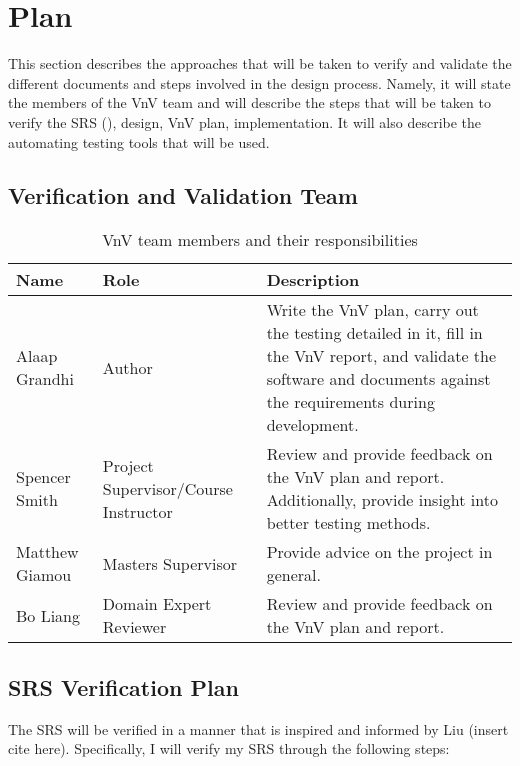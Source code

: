 \documentclass[12pt, titlepage]{article}
\begin{document}
\section{Plan}

This section describes the approaches that will be taken to verify and validate the different documents
and steps involved in the design process. Namely, it will state the members of the VnV team and will describe
the steps that will be taken to verify the SRS (\cite{SRS}), design, VnV plan, implementation. It will also describe the automating
testing tools that will be used.

\subsection{Verification and Validation Team}

\begin{table}[H]
  \centering
  \begin{tabular}{|p{3cm}|p{3cm}|p{6cm}|}
  \hline
  \textbf{Name} & \textbf{Role} & \textbf{Description} \\ \hline
  Alaap Grandhi & Author & Write the VnV plan, carry out the testing detailed in it, fill in the VnV report, and validate the software and documents against the requirements during development. \\ \hline
  Spencer Smith & Project Supervisor/Course Instructor & Review and provide feedback on the VnV plan and report. Additionally, provide insight into better testing methods. \\ \hline
  Matthew Giamou & Masters Supervisor & Provide advice on the project in general. \\ \hline
  Bo Liang & Domain Expert Reviewer & Review and provide feedback on the VnV plan and report. \\ \hline 
  \end{tabular}
  \caption{VnV team members and their responsibilities}
  \label{Table:VnV_Team}
\end{table}

\subsection{SRS Verification Plan}

The SRS will be verified in a manner that is inspired and informed by Liu (insert cite here).
Specifically, I will verify my SRS through the following steps:
\end{document}
